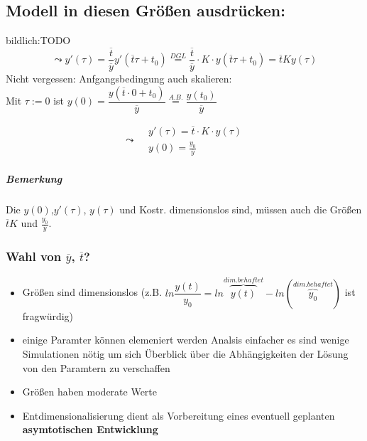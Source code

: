 \documentclass{article}
\numberwithin{equation}{section}
\begin{document}
\subsection{Modell in diesen Größen ausdrücken:}
bildlich:TODO\\
\begin{equation}
\leadsto
y'(\tau)=\frac{\overline{t}}{\overline{y}} y'(\overline{t}\tau + t_0)
\stackrel{DGL}{=}
\frac{\overline{t}}{\overline{y}}\cdot K \cdot y(\overline{t}\tau + t_0)
=\overline{t} K y(\tau)
\end{equation}
Nicht vergessen: Anfgangsbedingung auch skalieren:\\
Mit $ \tau:=0$ ist $y(0)=\dfrac{y(\overline{t}\cdot 0+t_0)}{\overline{y}}
\stackrel{A.B.}{=}
\dfrac{y(t_0)}{\overline{y}}$ 

\begin{equation}
\leadsto
\boxed{
\begin{aligned}
& y'(\tau)=\overline{t}\cdot K \cdot y(\tau)\\
& y(0)=\frac{y_0}{\overline{y}}
\end{aligned}
}
\end{equation}
\subparagraph{Bemerkung}
Die $y(0)$,$y'(\tau)$, $y(\tau)$ und Kostr. dimensionslos sind, müssen auch die Größen
$\overline{t}K$ und $\frac{y_0}{\overline{y}}$.

\subsubsection{Wahl von $\overline{y}$, $\overline{t}$?}
\begin{itemize}
	\item Größen sind dimensionslos (z.B. $ln\dfrac{y(t)}{y_0}=ln\stackrel{dim. behaftet}{\overbrace{y(t)}}-ln(\stackrel{dim. behaftet}{\overbrace{y_0}})$ ist fragwürdig)
	\item einige Paramter können elemeniert werden
	\subitem Analsis einfacher
	\subitem es sind wenige Simulationen nötig um sich Überblick über die Abhängigkeiten der Lösung von den Paramtern zu verschaffen
	\item Größen haben moderate Werte
	\item Entdimensionalisierung dient als Vorbereitung eines eventuell geplanten \textbf{asymtotischen Entwicklung}\cite{asyEnt}
\end{itemize}







\newpage



\end{document}
